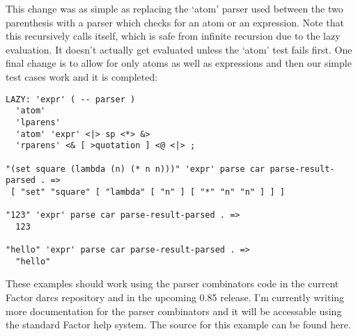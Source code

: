 This change was as simple as replacing the `atom' parser used between
the two parenthesis with a parser which checks for an atom or an
expression. Note that this recursively calls itself, which is safe
from infinite recursion due to the lazy evaluation. It doesn't
actually get evaluated unless the `atom' test fails first. One final
change is to allow for only atoms as well as expressions and then our
simple test cases work and it is completed:

\begin{verbatim}
LAZY: 'expr' ( -- parser )
  'atom'   
  'lparens' 
  'atom' 'expr' <|> sp <*> &>
  'rparens' <& [ >quotation ] <@ <|> ;

"(set square (lambda (n) (* n n)))" 'expr' parse car parse-result-parsed . =>
 [ "set" "square" [ "lambda" [ "n" ] [ "*" "n" "n" ] ] ]

"123" 'expr' parse car parse-result-parsed . => 
  123

"hello" 'expr' parse car parse-result-parsed . => 
  "hello"
\end{verbatim}

These examples should work using the parser combinators code in the
current Factor darcs repository and in the upcoming 0.85 release. I'm
currently writing more documentation for the parser combinators and it
will be accessable using the standard Factor help system. The source
for this example can be found here.
